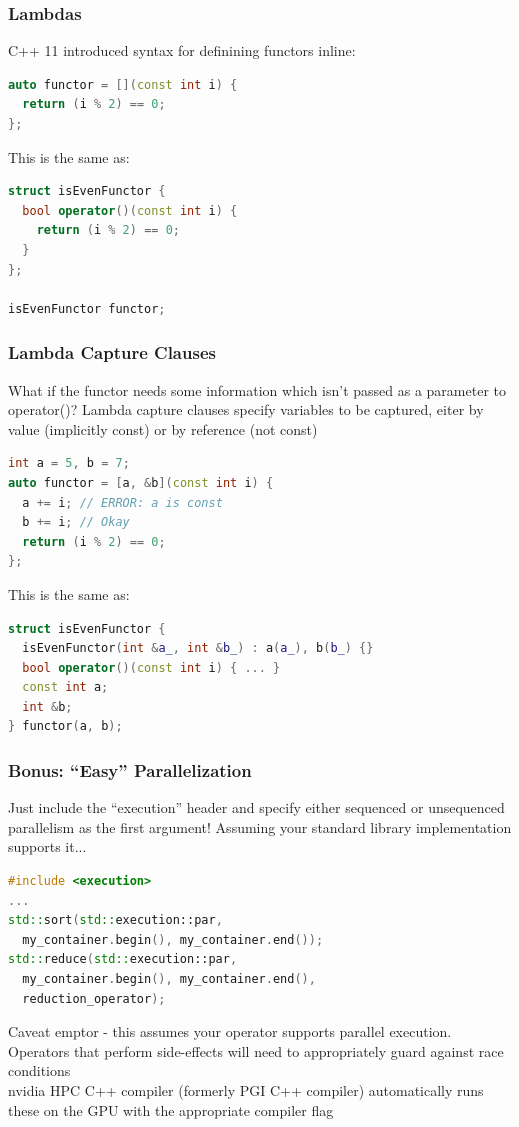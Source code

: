 \documentclass{beamer}
\begin{document}
\begin{frame}[fragile]
  \frametitle{Lambdas}
  C++ 11 introduced syntax for definining functors inline:
  \begin{lstlisting}[language=C++]
auto functor = [](const int i) {
  return (i % 2) == 0;
};
  \end{lstlisting}
This is the same as:
  \begin{lstlisting}[language=C++]
struct isEvenFunctor {
  bool operator()(const int i) {
    return (i % 2) == 0;
  }
};

isEvenFunctor functor;
  \end{lstlisting}
\end{frame}

\begin{frame}[fragile]
  \frametitle{Lambda Capture Clauses}
  What if the functor needs some information which isn't passed as a parameter to operator()?
  Lambda capture clauses specify variables to be captured, eiter by value (implicitly const)
  or by reference (not const)
  \begin{lstlisting}[language=C++]
int a = 5, b = 7;
auto functor = [a, &b](const int i) {
  a += i; // ERROR: a is const
  b += i; // Okay
  return (i % 2) == 0;
};
  \end{lstlisting}
This is the same as:
  \begin{lstlisting}[language=C++]
struct isEvenFunctor {
  isEvenFunctor(int &a_, int &b_) : a(a_), b(b_) {}
  bool operator()(const int i) { ... }
  const int a;
  int &b;
} functor(a, b);
  \end{lstlisting}
\end{frame}

\begin{frame}[fragile]
  \frametitle{Bonus: ``Easy'' Parallelization}
  Just include the ``execution'' header and specify either sequenced or unsequenced parallelism
  as the first argument!
  Assuming your standard library implementation supports it...
  \begin{lstlisting}[language=C++]
#include <execution>
...
std::sort(std::execution::par,
  my_container.begin(), my_container.end());
std::reduce(std::execution::par,
  my_container.begin(), my_container.end(),
  reduction_operator);
  \end{lstlisting}
  Caveat emptor - this assumes your operator supports parallel execution.
  Operators that perform side-effects will need to appropriately guard against race conditions\\
  nvidia HPC C++ compiler (formerly PGI C++ compiler) automatically runs these on the GPU with the appropriate compiler flag
\end{frame}
\end{document}

